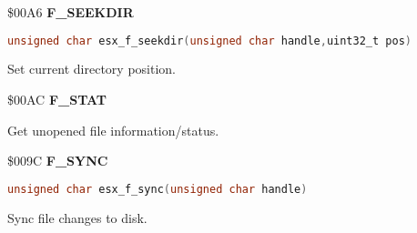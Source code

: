 \$00A6 \textbf{F\_SEEKDIR}

\begin{lstlisting}[language=C]
unsigned char esx_f_seekdir(unsigned char handle,uint32_t pos)
\end{lstlisting}

Set current directory position.


\$00AC \textbf{F\_STAT}

Get unopened file information/status.

%

\$009C \textbf{F\_SYNC}

\begin{lstlisting}[language=C]
unsigned char esx_f_sync(unsigned char handle)
\end{lstlisting}

Sync file changes to disk.


